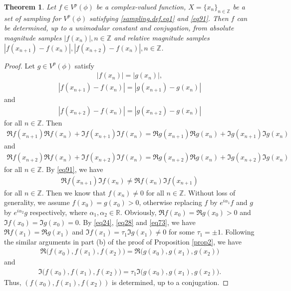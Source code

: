 \documentclass[12pt,oneside,reqno]{amsart}
\newtheorem{theorem}{Theorem}[section]
\newcommand{\Z}{\mathbb{Z}}
\newcommand{\R}{\mathbb{R}}
\numberwithin{equation}{section}
\begin{document}
\begin{theorem}\label{cpr.adj.thm}
	Let $f\in V^p(\phi)$ be a complex-valued function,  $X=\{x_n\}_{n\in \Z}$ be a set of sampling for $V^p(\phi)$ satisfying \eqref{sampling.def.eq1}  and \eqref{eq91}. Then $f$ can be determined, up to a unimodular constant and conjugation, from absolute magnitude samples $ |f(x_n)|, n\in \Z $ and relative magnitude samples $|f(x_{n+1})-f(x_n)|, |f(x_{n+2})-f(x_n)|, n\in \Z$.
\end{theorem}
\begin{proof}
	Let $g\in V^p(\phi)$ satisfy 
	\begin{align}\label{eq24}
		|f(x_n)| = |g(x_n)|, 
	\end{align}
	\begin{align*}
		|f(x_{n+1}) - f(x_n)| = |g(x_{n+1}) - g(x_n)|
	\end{align*}
	and
	\begin{align*}
		|f(x_{n+2}) - f(x_n)| = |g(x_{n+2}) - g(x_n)|
	\end{align*}
	for all $n\in \Z$.  
	Then
	\begin{align}\label{eq28}
		\Re f(x_{n+1})   \Re f(x_{n})    +  \Im f(x_{n+1})  \Im f(x_{n}) 
		=  \Re g(x_{n+1})   \Re g(x_{n}  )  +  \Im g(x_{n+1})   \Im g(x_{n}) 
	\end{align}
	and
	\begin{align}\label{eq29}
		\Re f(x_{n+2})   \Re f(x_{n})    +  \Im f(x_{n+2})  \Im f(x_{n}) 
		=  \Re g(x_{n+2})   \Re g(x_{n}  )  +  \Im g(x_{n+2})   \Im g(x_{n}) 
	\end{align}
	for all $n\in \Z$.
	By \eqref{eq91}, we have
	\begin{align}\label{eq73}
		\Re f(x_{n+1}) \Im f(x_{n}) \ne \Re f(x_{n}) \Im f(x_{n+1})
	\end{align}
	for all $n\in \Z$.
	Then we know that $f(x_n) \ne 0$ for all $n\in \Z$. Without loss of generality, we assume $f(x_0)=g(x_0)>0$, otherwise replacing $f$ by $e^{i\alpha_1}f$ and $g$ by $e^{i\alpha_2}g$ respectively, where $\alpha_1, \alpha_2\in \R$.
	Obviously, $\Re f(x_0) = \Re g(x_0) > 0$ and $ \Im f(x_0) = \Im g(x_0) =0$. By \eqref{eq24}, \eqref{eq28} and \eqref{eq73}, we have $\Re f(x_1) =  \Re g(x_1)$ and $ \Im f(x_1)= \tau_1 \Im g(x_1) \ne 0$ for some $\tau_1= \pm 1$. Following the similar arguments in part (b) of the proof of Proposition \ref{prop2}, we have
	\begin{align*}
		\Re\big(f(x_{0}), f(x_{1}), f(x_{2})\big) = \Re\big (g(x_{0}), g(x_{1}), g(x_{2})\big)
	\end{align*}
	and
	\begin{align*}
		\Im \big(f(x_{0}), f(x_{1}), f(x_{2}))= \tau_1 \Im (g(x_{0}), g(x_{1}), g(x_{2})\big).
	\end{align*}
	Thus, $(f(x_0), f(x_1), f(x_2))$ is determined, up to a conjugation.
	

\end{proof}
\end{document}
